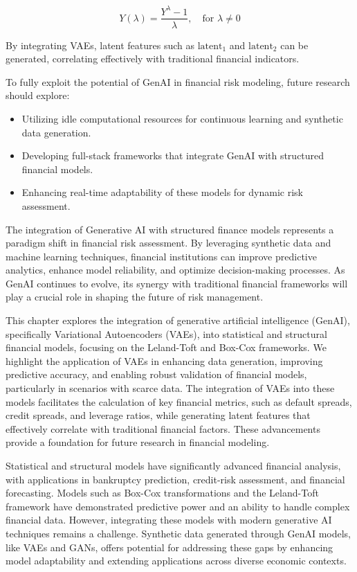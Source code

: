 \documentclass[a4paper,12pt]{scrbook}
\begin{document}
	\begin{equation}
		Y(\lambda) = \frac{Y^{\lambda} - 1}{\lambda}, \quad \text{for } \lambda \neq 0
	\end{equation}
	
	By integrating VAEs, latent features such as $\text{latent}_1$ and $\text{latent}_2$ can be generated, correlating effectively with traditional financial indicators.
	
	To fully exploit the potential of GenAI in financial risk modeling, future research should explore:
	\begin{itemize}
		\item Utilizing idle computational resources for continuous learning and synthetic data generation.
		\item Developing full-stack frameworks that integrate GenAI with structured financial models.
		\item Enhancing real-time adaptability of these models for dynamic risk assessment.
	\end{itemize}
	
	The integration of Generative AI with structured finance models represents a paradigm shift in financial risk assessment. By leveraging synthetic data and machine learning techniques, financial institutions can improve predictive analytics, enhance model reliability, and optimize decision-making processes. As GenAI continues to evolve, its synergy with traditional financial frameworks will play a crucial role in shaping the future of risk management.
	
	
	This chapter explores the integration of generative artificial intelligence (GenAI), specifically Variational Autoencoders (VAEs), into statistical and structural financial models, focusing on the Leland-Toft and Box-Cox frameworks. We highlight the application of VAEs in enhancing data generation, improving predictive accuracy, and enabling robust validation of financial models, particularly in scenarios with scarce data. The integration of VAEs into these models facilitates the calculation of key financial metrics, such as default spreads, credit spreads, and leverage ratios, while generating latent features that effectively correlate with traditional financial factors. These advancements provide a foundation for future research in financial modeling.
	
	Statistical and structural models have significantly advanced financial analysis, with applications in bankruptcy prediction, credit-risk assessment, and financial forecasting. Models such as Box-Cox transformations and the Leland-Toft framework have demonstrated predictive power and an ability to handle complex financial data. However, integrating these models with modern generative AI techniques remains a challenge. Synthetic data generated through GenAI models, like VAEs and GANs, offers potential for addressing these gaps by enhancing model adaptability and extending applications across diverse economic contexts.
	
\end{document}
